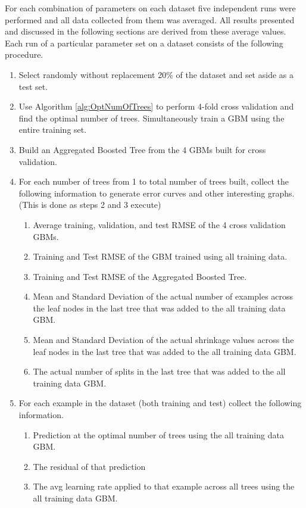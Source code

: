 \documentclass[9pt, conference]{IEEEtran}
\begin{document}
For each combination of parameters on each dataset five independent runs were performed and all data collected from them was averaged. All results  presented and discussed in the following sections are derived from these average values. Each run of a particular parameter set on a dataset consists of the following procedure.
\begin{enumerate}
	\item Select randomly without replacement 20\% of the dataset and set aside as a test set.
	\item Use Algorithm \ref{alg:OptNumOfTrees} to perform 4-fold cross validation and find the optimal number of trees. Simultaneously train a GBM using the entire training set. 
	\item Build an Aggregated Boosted Tree from the 4 GBMs built for cross validation.
	\item For each number of trees from 1 to total number of trees built, collect the following information to generate error curves and other interesting graphs. (This is done as steps 2 and 3 execute)
		\begin{enumerate}
		\item Average training, validation, and test RMSE of the 4 cross validation GBMs.
		\item Training and Test RMSE of the GBM trained using all training data.
		\item Training and Test RMSE of the Aggregated Boosted Tree.
		\item Mean and Standard Deviation of the actual number of examples across the leaf nodes in the last tree that was added to the all training data GBM.
		\item Mean and Standard Deviation of the actual shrinkage values across the leaf nodes in the last tree that was added to the all training data GBM.
		\item The actual number of splits in the last tree that was added to the all training data GBM.
		\end{enumerate}
	\item For each example in the dataset (both training and test) collect the following information.
	\begin{enumerate}
		\item Prediction at the optimal number of trees using the all training data GBM.
		\item The residual of that prediction
		\item The avg learning rate applied to that example across all trees using the all training data GBM.
	\end{enumerate}


\end{enumerate}
\end{document}
